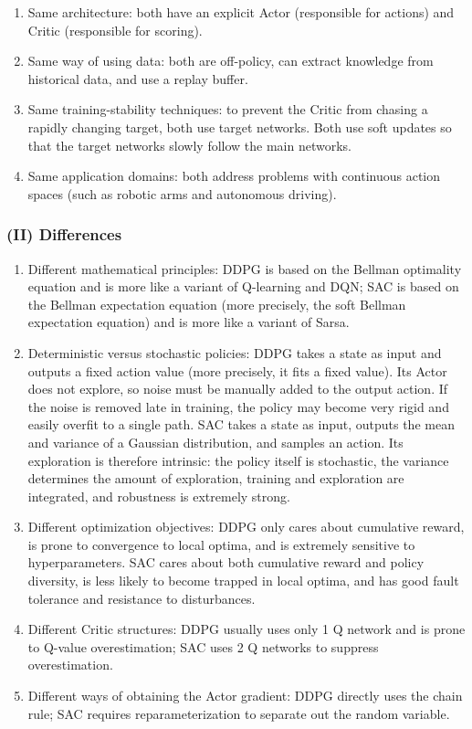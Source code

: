 \begin{enumerate}
\def\labelenumi{\arabic{enumi}.}
\item
  Same architecture: both have an explicit Actor (responsible for actions) and Critic (responsible for scoring).
\item
  Same way of using data: both are off-policy, can extract knowledge from historical data, and use a replay buffer.
\item
  Same training-stability techniques: to prevent the Critic from chasing a rapidly changing target, both use target networks. Both use soft updates so that the target networks slowly follow the main networks.
\item
  Same application domains: both address problems with continuous action spaces (such as robotic arms and autonomous driving).
\end{enumerate}

\hypertarget{ii-differences}{%
\subsubsection{(II) Differences}\label{ii-differences}}

\begin{enumerate}
\def\labelenumi{\arabic{enumi}.}
\item
  Different mathematical principles: DDPG is based on the Bellman optimality equation and is more like a variant of Q-learning and DQN; SAC is based on the Bellman expectation equation (more precisely, the soft Bellman expectation equation) and is more like a variant of Sarsa.
\item
  Deterministic versus stochastic policies: DDPG takes a state as input and outputs a fixed action value (more precisely, it fits a fixed value). Its Actor does not explore, so noise must be manually added to the output action. If the noise is removed late in training, the policy may become very rigid and easily overfit to a single path. SAC takes a state as input, outputs the mean and variance of a Gaussian distribution, and samples an action. Its exploration is therefore intrinsic: the policy itself is stochastic, the variance determines the amount of exploration, training and exploration are integrated, and robustness is extremely strong.
\item
  Different optimization objectives: DDPG only cares about cumulative reward, is prone to convergence to local optima, and is extremely sensitive to hyperparameters. SAC cares about both cumulative reward and policy diversity, is less likely to become trapped in local optima, and has good fault tolerance and resistance to disturbances.
\item
  Different Critic structures: DDPG usually uses only 1 Q network and is prone to Q-value overestimation; SAC uses 2 Q networks to suppress overestimation.
\item
  Different ways of obtaining the Actor gradient: DDPG directly uses the chain rule; SAC requires reparameterization to separate out the random variable.
\end{enumerate}

